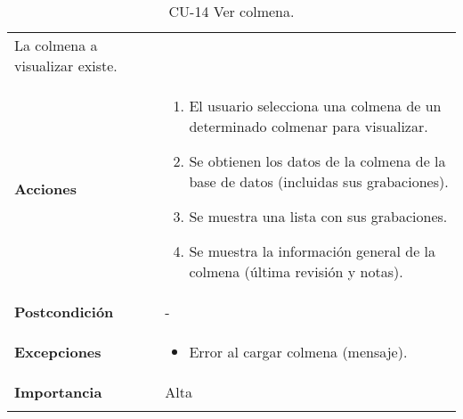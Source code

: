 \begin{longtable}[H]{@{}ll@{}}
\begin{minipage}[t]{0.73\columnwidth}
La colmena a visualizar existe.\strut
\end{minipage}\tabularnewline
\begin{minipage}[t]{0.21\columnwidth}\raggedright\strut
\textbf{Acciones}\strut
\end{minipage} & \begin{minipage}[t]{0.73\columnwidth}\raggedright\strut
\begin{enumerate}
\def\labelenumi{\arabic{enumi}.}
\tightlist
\item
  El usuario selecciona una colmena de un determinado colmenar para
  visualizar.
\item
  Se obtienen los datos de la colmena de la base de datos (incluidas sus
  grabaciones).
\item
  Se muestra una lista con sus grabaciones.
\item
  Se muestra la información general de la colmena (última revisión y
  notas).
\end{enumerate}\strut
\end{minipage}\tabularnewline
\begin{minipage}[t]{0.21\columnwidth}\raggedright\strut
\textbf{Postcondición}\strut
\end{minipage} & \begin{minipage}[t]{0.73\columnwidth}\raggedright\strut
-\strut
\end{minipage}\tabularnewline
\begin{minipage}[t]{0.21\columnwidth}\raggedright\strut
\textbf{Excepciones}\strut
\end{minipage} & \begin{minipage}[t]{0.73\columnwidth}\raggedright\strut
\begin{itemize}
\tightlist
\item
  Error al cargar colmena (mensaje).
\end{itemize}\strut
\end{minipage}\tabularnewline
\begin{minipage}[t]{0.21\columnwidth}\raggedright\strut
\textbf{Importancia}\strut
\end{minipage} & \begin{minipage}[t]{0.73\columnwidth}\raggedright\strut
Alta\strut
\end{minipage}\tabularnewline
\bottomrule
\caption{CU-14 Ver colmena.}
\end{longtable}

